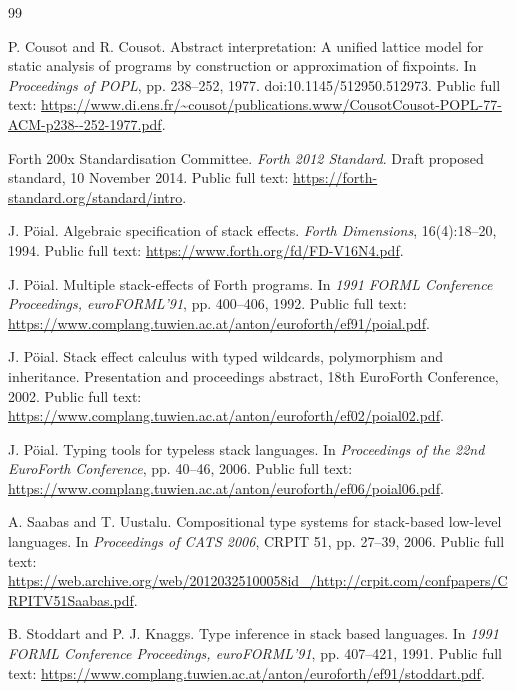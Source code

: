 \documentclass[11pt,a4paper]{article}
\begin{document}
\begin{thebibliography}{99}
\footnotesize
\setlength{\itemsep}{0pt}
\setlength{\parsep}{0pt}
\raggedright

P. Cousot and R. Cousot.
\newblock Abstract interpretation: A unified lattice model for static analysis
of programs by construction or approximation of fixpoints.
\newblock In \emph{Proceedings of POPL}, pp. 238--252, 1977.
\newblock doi:10.1145/512950.512973.
\newblock Public full text:
\url{https://www.di.ens.fr/~cousot/publications.www/CousotCousot-POPL-77-ACM-p238--252-1977.pdf}.

Forth 200x Standardisation Committee.
\newblock \emph{Forth 2012 Standard}.
\newblock Draft proposed standard, 10 November 2014.
\newblock Public full text:
\url{https://forth-standard.org/standard/intro}.

J. Pöial.
\newblock Algebraic specification of stack effects.
\newblock \emph{Forth Dimensions}, 16(4):18--20, 1994.
\newblock Public full text:
\url{https://www.forth.org/fd/FD-V16N4.pdf}.

J. Pöial.
\newblock Multiple stack-effects of Forth programs.
\newblock In \emph{1991 FORML Conference Proceedings, euroFORML'91},
pp. 400--406, 1992.
\newblock Public full text:
\url{https://www.complang.tuwien.ac.at/anton/euroforth/ef91/poial.pdf}.

J. Pöial.
\newblock Stack effect calculus with typed wildcards, polymorphism and
inheritance.
\newblock Presentation and proceedings abstract, 18th EuroForth Conference,
2002.
\newblock Public full text:
\url{https://www.complang.tuwien.ac.at/anton/euroforth/ef02/poial02.pdf}.

J. Pöial.
\newblock Typing tools for typeless stack languages.
\newblock In \emph{Proceedings of the 22nd EuroForth Conference},
pp. 40--46, 2006.
\newblock Public full text:
\url{https://www.complang.tuwien.ac.at/anton/euroforth/ef06/poial06.pdf}.

A. Saabas and T. Uustalu.
\newblock Compositional type systems for stack-based low-level languages.
\newblock In \emph{Proceedings of CATS 2006}, CRPIT 51, pp. 27--39, 2006.
\newblock Public full text:
\url{https://web.archive.org/web/20120325100058id_/http://crpit.com/confpapers/CRPITV51Saabas.pdf}.

B. Stoddart and P. J. Knaggs.
\newblock Type inference in stack based languages.
\newblock In \emph{1991 FORML Conference Proceedings, euroFORML'91},
pp. 407--421, 1991.
\newblock Public full text:
\url{https://www.complang.tuwien.ac.at/anton/euroforth/ef91/stoddart.pdf}.

\end{thebibliography}
\end{document}
